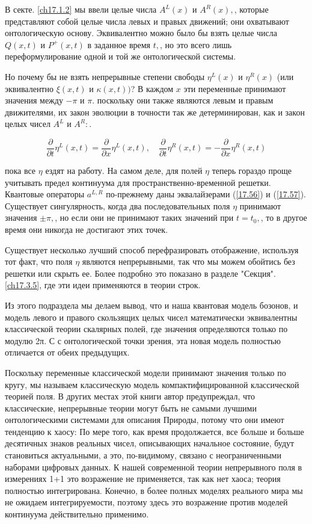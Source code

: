\documentclass[main.tex]{subfiles}
\begin{document}
В секте. \ref{ch17.1.2} мы ввели целые числа $A^{L}(x)$ и $A^{R}(x),$, которые представляют собой целые числа левых и правых движений; они охватывают онтологическую основу. Эквивалентно можно было бы взять целые числа $Q(x, t)$ и $P^{+}(x, t)$ в заданное время $t,$, но это всего лишь переформулирование одной и той же онтологической системы.

Но почему бы не взять непрерывные степени свободы $\eta^{L}(x)$ и $\eta^{R}(x)$ (или эквивалентно $\xi(x, t)$ и $\kappa(x, t))$? В каждом $x$ эти переменные принимают значения между $-\pi$ и $\pi$. поскольку они также являются левым и правым движителями, их закон эволюции в точности так же детерминирован, как и закон целых чисел $A^{L}$ и $A^{R}:$.

\begin{equation}\label{17.64}
\frac{\partial}{\partial t} \eta^{L}(x, t)=\frac{\partial}{\partial x} \eta^{L}(x, t), \quad \frac{\partial}{\partial t} \eta^{R}(x, t)=-\frac{\partial}{\partial x} \eta^{R}(x, t)
\end{equation}

пока все $\eta$ ездят на работу. На самом деле, для полей $\eta$ теперь гораздо проще учитывать предел континуума для пространственно-временной решетки. Квантовые операторы $a^{L, R}$ по-прежнему даны эквалайзерами (\ref{17.56}) и (\ref{17.57}). Существует сингулярность, когда два последовательных поля $\eta$ принимают значения $\pm \pi,$, но если они не принимают таких значений при $t=t_{0},$, то в другое время они никогда не достигают этих точек.

Существует несколько лучший способ перефразировать отображение, используя тот факт, что поля $\eta$ являются непрерывными, так что мы можем обойтись без решетки или скрыть ее. Более подробно это показано в разделе "Секция". \ref{ch17.3.5}, где эти идеи применяются в теории строк.

Из этого подраздела мы делаем вывод, что и наша квантовая модель бозонов, и модель левого и правого скользящих целых чисел математически эквивалентны классической теории скалярных полей, где значения определяются только по модулю 2π. С
с онтологической точки зрения, эта новая модель полностью отличается от обеих предыдущих.

Поскольку переменные классической модели принимают значения только по кругу, мы называем классическую модель компактифицированной классической теорией поля. В других местах этой книги автор предупреждал, что классические, непрерывные теории могут быть не самыми лучшими онтологическими системами для описания Природы, потому что они имеют тенденцию к хаосу: По мере того, как время продолжается, все больше и больше десятичных знаков реальных чисел, описывающих начальное состояние, будут становиться актуальными, а это, по-видимому, связано с неограниченными наборами цифровых данных. К нашей современной теории непрерывного поля в измерениях 1+1 это возражение не применяется, так как нет хаоса; теория полностью интегрирована. Конечно, в более полных моделях реального мира мы не ожидаем интегрируемости, поэтому здесь это возражение против моделей континуума действительно применимо.
\end{document}
